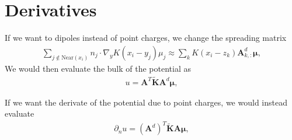 \documentclass[11pt]{article}
\begin{document}
\section{Derivatives}

If we want to dipoles instead of point charges, we change the spreading matrix
\begin{align*}
  \sum_{j \not \in \text{Near}(x_i)} n_j\cdot\nabla_y K(x_i - y_j) \mu_j \approx \sum_{k}  K(x_i - z_k)\boldsymbol{A}^d_{k, :} \boldsymbol{\mu},
\end{align*}
We would then evaluate the  bulk of the potential as
\begin{align}
u =   \boldsymbol{A}^T\tilde{\boldsymbol{K}} \boldsymbol{A}^d \boldsymbol{\mu},
\end{align}

If we want the derivate of the potential due to point charges, we would instead evaluate
\begin{align}
\partial_n u =   (\boldsymbol{A}^d)^T\tilde{\boldsymbol{K}} \boldsymbol{A} \boldsymbol{\mu},
\end{align}
\end{document}
